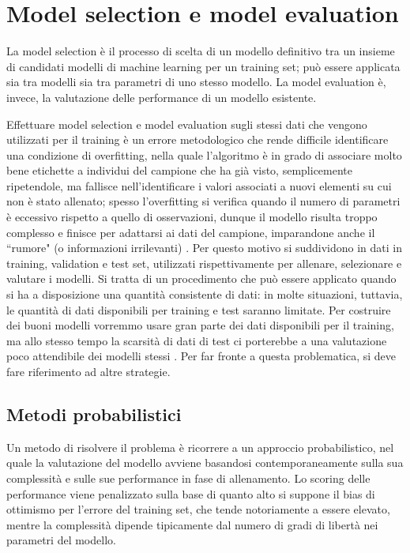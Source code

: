 \documentclass[12pt,a4paper]{report}
\begin{document}
\section{Model selection e model evaluation}
La model selection è il processo di scelta di un modello definitivo tra un insieme di candidati modelli di machine learning per un training set; può essere applicata sia tra modelli sia tra parametri di uno stesso modello.
La model evaluation è, invece, la valutazione delle performance di un modello esistente.

Effettuare model selection e model evaluation sugli stessi dati che vengono utilizzati per il training  è un errore metodologico \cite{scikit-learn} che rende difficile identificare una condizione di overfitting, nella quale l'algoritmo è in grado di associare molto bene etichette a individui del campione che ha già visto, semplicemente ripetendole, ma fallisce nell'identificare i valori associati a nuovi elementi su cui non è stato allenato; spesso l'overfitting si verifica quando il numero di parametri è eccessivo rispetto a quello di osservazioni, dunque il modello risulta troppo complesso e finisce per adattarsi ai dati del campione, imparandone anche il ``rumore" (o informazioni irrilevanti) \cite{IBMlearning}.
Per questo motivo si suddividono in dati in training, validation e test set, utilizzati rispettivamente per allenare, selezionare e valutare i modelli.
Si tratta di un procedimento che può essere applicato quando si ha a disposizione una quantità consistente di dati: in molte situazioni, tuttavia, le quantità di dati disponibili per training e test saranno limitate. Per costruire dei buoni modelli vorremmo usare gran parte dei dati disponibili per il training, ma allo stesso tempo la scarsità di dati di test ci porterebbe a una valutazione poco attendibile dei modelli stessi \cite{patternRecognitionML}.	
Per far fronte a questa problematica, si deve fare riferimento ad altre strategie.

\subsection{Metodi probabilistici}

Un metodo di risolvere il problema è ricorrere a un approccio probabilistico, nel quale la valutazione del modello avviene basandosi contemporaneamente sulla sua complessità e sulle sue performance in fase di allenamento.
Lo scoring delle performance viene penalizzato sulla base di quanto alto si suppone il bias di ottimismo per l'errore del training set, che tende notoriamente a essere elevato, mentre la complessità dipende tipicamente dal numero di gradi di libertà nei parametri del modello.
\end{document}
